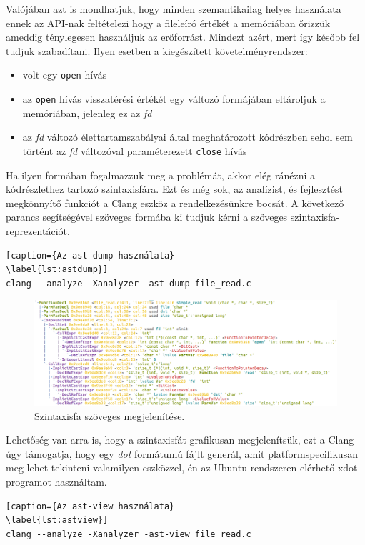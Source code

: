 \documentclass[a4paper,12pt]{report}
\begin{document}
Valójában azt is mondhatjuk, hogy minden szemantikailag helyes használata ennek az API-nak feltételezi hogy a fileleíró értékét a memóriában őrizzük ameddig ténylegesen használjuk az erőforrást. Mindezt azért, mert így később fel tudjuk szabadítani. Ilyen esetben a kiegészített követelményrendszer:
\begin{itemize}
\item volt egy \texttt{open} hívás
\item az \texttt{open} hívás visszatérési értékét egy változó formájában eltároljuk a memóriában, jelenleg ez az \emph{fd}
\item az \emph{fd} változó élettartamszabályai által meghatározott kódrészben sehol sem történt az \emph{fd} változóval paraméterezett \texttt{close} hívás
\end{itemize}
Ha ilyen formában fogalmazzuk meg a problémát, akkor elég ránézni a kódrészlethez tartozó szintaxisfára. Ezt és még sok, az analízist, és fejlesztést megkönnyítő funkciót a Clang eszköz a rendelkezésünkre bocsát. A következő parancs segítségével szöveges formába ki tudjuk kérni a szöveges szintaxisfa-reprezentációt.
\begin{lstlisting}[caption={Az ast-dump használata}
\label{lst:astdump}]
clang --analyze -Xanalyzer -ast-dump file_read.c
\end{lstlisting}

\begin{figure}[h]
\centering
\includegraphics[scale=0.27]{astdumptomorrow.png}
\caption{Szintaxisfa szöveges megjelenítése.}
\end{figure}

Lehetőség van arra is, hogy a szintaxisfát grafikusan megjelenítsük, ezt a Clang úgy támogatja, hogy egy \emph{dot} formátumú fájlt generál, amit platformspecifikusan meg lehet tekinteni valamilyen eszközzel, én az Ubuntu rendszeren elérhető xdot programot használtam.
\begin{lstlisting}[caption={Az ast-view használata}
\label{lst:astview}]
clang --analyze -Xanalyzer -ast-view file_read.c
\end{lstlisting}
\end{document}
